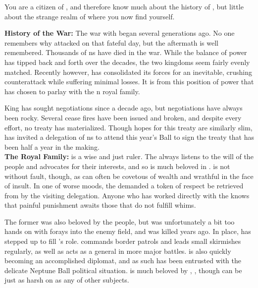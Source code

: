 \documentclass[blue]{NeptuneBall}
\begin{document}
\name{\bPacifican{}}

You are a citizen of \pPacifica{}, and therefore know much about the history of \pPacifica{}, but little about the strange realm of \pAtlantis{} where you now find yourself.

{\bf History of the War:}
The war with \pAtlantis{} began several generations ago. No one remembers why \pAtlantis{} attacked on that fateful day, but the aftermath is well remembered. Thousands of \pPacifica{}ns have died in the war. While the balance of power has tipped back and forth over the decades, the two kingdoms seem fairly evenly matched. Recently however, \pPacifica{} has consolidated its forces for an inevitable, crushing counterattack while suffering minimal losses. It is from this position of power that \cPacificanRuler{\King} \cPacificanRuler{} has chosen to parlay with the \pAtlantis{}n royal family.

King \cKing{\MYname{}} has sought negotiations since a decade ago, but negotiations have always been rocky. Several cease fires have been issued and broken, and despite every effort, no treaty has materialized. Though hopes for this treaty are similarly slim, \cKing{\King} \cKing{} has invited a delegation of \pPacifica{}ns to attend this year's \cExExKing{} Ball to sign the treaty that has been half a year in the making.\\

{\bf The Royal Family:}
\cPacificanRuler{\King} \cPacificanRuler{} is a wise and just ruler. The \cPacificanRuler{\King} always listens to the will of the people and advocates for their interests, and so is much beloved in \pPacifica{}. \cPacificanRuler{\They} is not without fault, though, as \cPacificanRuler{\they} can often be covetous of wealth and wrathful in the face of insult. In one of \cPacificanRuler{\their} worse moods, the \cPacificanRuler{\King} demanded a token of respect be retrieved from \pAtlantis{} by the visiting delegation. Anyone who has worked directly with the \cPacificanRuler{\King} knows that painful punishment awaits those that do not fulfill \cPacificanRuler{\their} whims.

The former \cPacificanRulerSpouse{\King} \cPacificanRulerSpouse{} was also beloved by the people, but was unfortunately a bit too hands on with \cPacificanRulerSpouse{\their} forays into the enemy field, and was killed years ago. In \cPacificanRulerSpouse{\their} place, \cPrince{\Prince} \cPrince{} has stepped up to fill \cPrince{\their} \cPacificanRulerSpouse{\parent}'s role. \cPrince{} commands border patrols and leads small skirmishes regularly, as well as acts as a general in more major battles. \cPrince{} is also quickly becoming an accomplished diplomat, and as such has been entrusted with the delicate Neptune Ball political situation. \cPrince{\they} is much beloved by \cPrince{\their} \cPacificanRuler{\parent}, \cPacificanRuler{\King} \cPacificanRuler{}, though \cPacificanRuler{\they} can be just as harsh on \cPrince{} as any of \cPacificanRuler{\their} other subjects.\\
\end{document}
